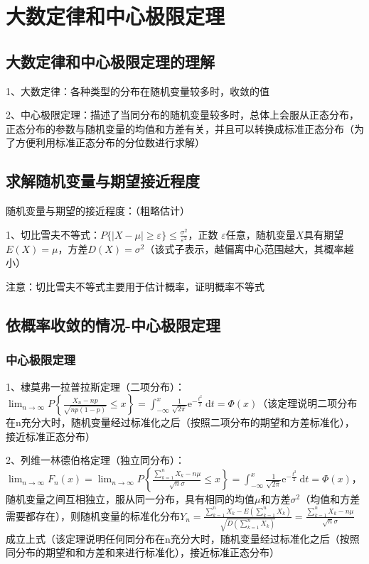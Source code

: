 \chapter{大数定律和中心极限定理}

\section{大数定律和中心极限定理的理解}

1、大数定律：各种类型的分布在随机变量较多时，收敛的值

2、中心极限定理：描述了当同分布的随机变量较多时，总体上会服从正态分布，正态分布的参数与随机变量的均值和方差有关，并且可以转换成标准正态分布（为了方便利用标准正态分布的分位数进行求解）

\section{求解随机变量与期望接近程度}

随机变量与期望的接近程度：（粗略估计）

1、切比雪夫不等式：$P\{|X-\mu| \geqslant \varepsilon\} \leqslant \frac{\sigma^{2}}{\varepsilon^{2}}$，正数 $\varepsilon$任意，随机变量$X$具有期望$E(X)=\mu$，方差$D(X)=\sigma^{2}$（该式子表示，越偏离中心范围越大，其概率越小）

注意：切比雪夫不等式主要用于估计概率，证明概率不等式

\section{依概率收敛的情况-中心极限定理}



\subsection{中心极限定理}

1、棣莫弗一拉普拉斯定理（二项分布）：$\lim _{n \rightarrow \infty} P\left\{\frac{X_{n}-n p}{\sqrt{n p(1-p)}} \leqslant x\right\}=\int_{-\infty}^{x} \frac{1}{\sqrt{2 \pi}} \mathrm{e}^{-\frac{t^{2}}{2}} \mathrm{~d} t=\Phi(x)$（该定理说明二项分布在n充分大时，随机变量经过标准化之后（按照二项分布的期望和方差标准化），接近标准正态分布）

2、列维一林德伯格定理（独立同分布）：$\lim_{n \rightarrow \infty} F_{n}(x)=\lim_{n \rightarrow \infty} P\left\{\frac{\sum_{k=1}^{n} X_{k}-n \mu}{\sqrt{n} \sigma} \leqslant x\right\}=\int_{-\infty}^{x} \frac{1}{\sqrt{2 \pi}} \mathrm{e}^{-\frac{t^{2}}{2}} \mathrm{~d} t=\Phi(x)$，随机变量之间互相独立，服从同一分布，具有相同的均值$\mu$和方差$\sigma^2$（均值和方差需要都存在），则随机变量的标准化分布$Y_{n}=\frac{\sum_{k=1}^{n} X_{k}-E\left(\sum_{k=1}^{n} X_{k}\right)}{\sqrt{D\left(\sum_{k=1}^{n} X_{k}\right)}}=\frac{\sum_{k=1}^{n} X_{k}-n \mu}{\sqrt{n} \sigma}$成立上式（该定理说明任何同分布在n充分大时，随机变量经过标准化之后（按照同分布的期望和和方差和来进行标准化），接近标准正态分布）



